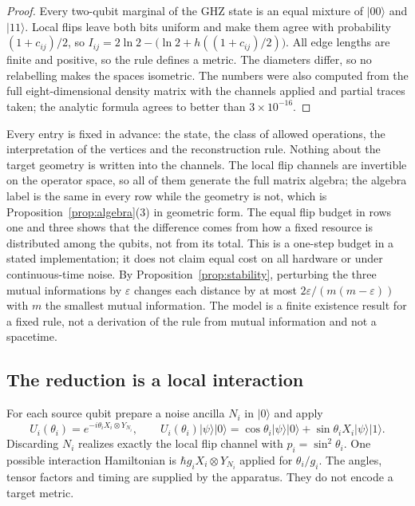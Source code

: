 \documentclass[12pt,a4paper]{article}
\begin{document}
\begin{proof}
Every two-qubit marginal of the GHZ state is an equal mixture of $|00\rangle$ and $|11\rangle$. Local flips leave both bits uniform and make them agree with probability $(1+c_{ij})/2$, so $I_{ij}=2\ln2-\bigl(\ln2+h((1+c_{ij})/2)\bigr)$. All edge lengths are finite and positive, so the rule defines a metric. The diameters differ, so no relabelling makes the spaces isometric. The numbers were also computed from the full eight-dimensional density matrix with the channels applied and partial traces taken; the analytic formula agrees to better than $3\times10^{-16}$.
\end{proof}

Every entry is fixed in advance: the state, the class of allowed operations, the interpretation of the vertices and the reconstruction rule. Nothing about the target geometry is written into the channels. The local flip channels are invertible on the operator space, so all of them generate the full matrix algebra; the algebra label is the same in every row while the geometry is not, which is Proposition~\ref{prop:algebra}(3) in geometric form. The equal flip budget in rows one and three shows that the difference comes from how a fixed resource is distributed among the qubits, not from its total. This is a one-step budget in a stated implementation; it does not claim equal cost on all hardware or under continuous-time noise. By Proposition~\ref{prop:stability}, perturbing the three mutual informations by $\varepsilon$ changes each distance by at most $2\varepsilon/(m(m-\varepsilon))$ with $m$ the smallest mutual information. The model is a finite existence result for a fixed rule, not a derivation of the rule from mutual information and not a spacetime.

\subsection{The reduction is a local interaction}
\label{sec:physical}

For each source qubit prepare a noise ancilla $N_i$ in $|0\rangle$ and
apply
\[
U_i(\theta_i)=e^{-i\theta_i X_i\otimes Y_{N_i}},
\qquad
U_i(\theta_i)|\psi\rangle|0\rangle
 =\cos\theta_i|\psi\rangle|0\rangle
  +\sin\theta_i X_i|\psi\rangle|1\rangle .
\]
Discarding $N_i$ realizes exactly the local flip channel with
$p_i=\sin^2\theta_i$. One possible interaction Hamiltonian is
$\hbar g_iX_i\otimes Y_{N_i}$ applied for $\theta_i/g_i$.
The angles, tensor factors and timing are supplied by the apparatus.
They do not encode a target metric.
\end{document}
